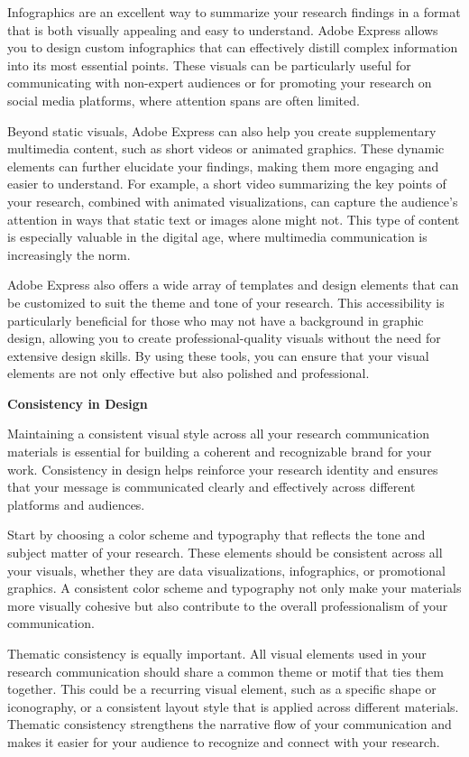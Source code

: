 \documentclass[
]{book}
\begin{document}
Infographics are an excellent way to summarize your research findings in a format that is both visually appealing and easy to understand. Adobe Express allows you to design custom infographics that can effectively distill complex information into its most essential points. These visuals can be particularly useful for communicating with non-expert audiences or for promoting your research on social media platforms, where attention spans are often limited.

Beyond static visuals, Adobe Express can also help you create supplementary multimedia content, such as short videos or animated graphics. These dynamic elements can further elucidate your findings, making them more engaging and easier to understand. For example, a short video summarizing the key points of your research, combined with animated visualizations, can capture the audience's attention in ways that static text or images alone might not. This type of content is especially valuable in the digital age, where multimedia communication is increasingly the norm.

Adobe Express also offers a wide array of templates and design elements that can be customized to suit the theme and tone of your research. This accessibility is particularly beneficial for those who may not have a background in graphic design, allowing you to create professional-quality visuals without the need for extensive design skills. By using these tools, you can ensure that your visual elements are not only effective but also polished and professional.

\textbf{Consistency in Design}

Maintaining a consistent visual style across all your research communication materials is essential for building a coherent and recognizable brand for your work. Consistency in design helps reinforce your research identity and ensures that your message is communicated clearly and effectively across different platforms and audiences.

Start by choosing a color scheme and typography that reflects the tone and subject matter of your research. These elements should be consistent across all your visuals, whether they are data visualizations, infographics, or promotional graphics. A consistent color scheme and typography not only make your materials more visually cohesive but also contribute to the overall professionalism of your communication.

Thematic consistency is equally important. All visual elements used in your research communication should share a common theme or motif that ties them together. This could be a recurring visual element, such as a specific shape or iconography, or a consistent layout style that is applied across different materials. Thematic consistency strengthens the narrative flow of your communication and makes it easier for your audience to recognize and connect with your research.
\end{document}
